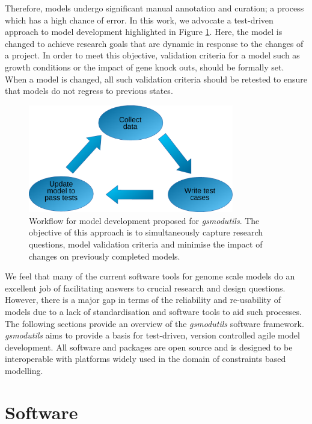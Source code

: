 \documentclass[journal=asbcd6]{achemso}
\begin{document}
Therefore, models undergo significant manual annotation and curation; a process which has a high chance of error.
In this work, we advocate a test-driven approach to model development highlighted in Figure \ref{fig:test_driven}.
Here, the model is changed to achieve research goals that are dynamic in response to the changes of a project.
In order to meet this objective, validation criteria for a model such as growth conditions or the impact of gene knock outs, should be formally set.
When a model is changed, all such validation criteria should be retested to ensure that models do not regress to previous states.

\begin{figure}[ht]
\centering
\includegraphics[width=0.8\textwidth]{testdriven.eps}
\caption{Workflow for model development proposed for \textit{gsmodutils}.
The objective of this approach is to simultaneously capture research questions, model validation criteria and minimise the impact of changes on previously completed models.
}
\label{fig:test_driven}
\end{figure}

We feel that many of the current software tools for genome scale models do an excellent job of facilitating answers to crucial research and design questions.
However, there is a major gap in terms of the reliability and re-usability of models due to a lack of standardisation and software tools to aid such processes.
The following sections provide an overview of the \textit{gsmodutils} software framework.
\textit{gsmodutils} aims to provide a basis for test-driven, version controlled agile model development.
All software and packages are open source and is designed to be interoperable with platforms widely used in the domain of constraints based modelling.

\section{Software}
\end{document}
